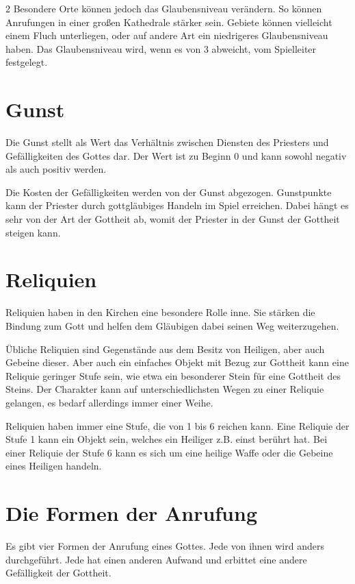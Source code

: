 \begin{multicols}{2}
{Besondere Orte können jedoch das Glaubensniveau verändern. So können Anrufungen in einer großen Kathedrale stärker sein. Gebiete können vielleicht einem Fluch unterliegen, oder auf andere Art ein niedrigeres Glaubensniveau haben. Das Glaubensniveau wird, wenn es von 3 abweicht, vom Spielleiter festgelegt.
}

\section{Gunst}

Die Gunst stellt als Wert das Verhältnis zwischen Diensten des Priesters und Gefälligkeiten des Gottes dar. Der Wert ist zu Beginn 0 und kann sowohl negativ als auch positiv werden.

Die Kosten der Gefälligkeiten werden von der Gunst abgezogen. Gunstpunkte kann der Priester durch gottgläubiges Handeln im Spiel erreichen. Dabei hängt es sehr von der Art der Gottheit ab, womit der Priester in der Gunst der Gottheit steigen kann.

\section{Reliquien}

Reliquien haben in den Kirchen eine besondere Rolle inne. Sie stärken die Bindung zum Gott und helfen dem Gläubigen dabei seinen Weg weiterzugehen.

Übliche Reliquien sind Gegenstände aus dem Besitz von Heiligen, aber auch Gebeine dieser. Aber auch ein einfaches Objekt mit Bezug zur Gottheit kann eine Reliquie geringer Stufe sein, wie etwa ein besonderer Stein für eine Gottheit des Steins. Der Charakter kann auf unterschiedlichsten Wegen zu einer Reliquie gelangen, es bedarf allerdings immer einer Weihe.

Reliquien haben immer eine Stufe, die von 1 bis 6 reichen kann. Eine Reliquie der Stufe 1 kann ein Objekt sein, welches ein Heiliger z.B. einst berührt hat. Bei einer Reliquie der Stufe 6 kann es sich um eine heilige Waffe oder die Gebeine eines Heiligen handeln.

\section{Die Formen der Anrufung}

Es gibt vier Formen der Anrufung eines Gottes. Jede von ihnen wird anders durchgeführt. Jede hat einen anderen Aufwand und erbittet eine andere Gefälligkeit der Gottheit.


\end{multicols}

